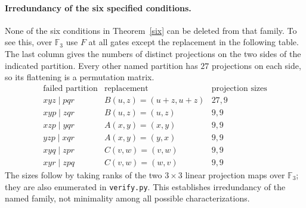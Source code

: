 \documentclass[11pt]{article}
\begin{document}
\paragraph{Irredundancy of the six specified conditions.}
None of the six conditions in Theorem~\ref{six} can be deleted from
that family. To see this, over $\mathbb F_3$ use $F$ at all gates
except the replacement in the following table. The last column gives
the numbers of distinct projections on the two sides of the indicated
partition. Every other named partition has $27$ projections on each
side, so its flattening is a permutation matrix.
\[
\begin{array}{c|c|c}
\text{failed partition}&\text{replacement}&\text{projection sizes}\\\hline
xyz\mid pqr&B(u,z)=(u+z,u+z)&27,9\\
xyp\mid zqr&B(u,z)=(u,z)&9,9\\
xzp\mid yqr&A(x,y)=(x,y)&9,9\\
yzp\mid xqr&A(x,y)=(y,x)&9,9\\
xyq\mid zpr&C(v,w)=(v,w)&9,9\\
xyr\mid zpq&C(v,w)=(w,v)&9,9
\end{array}
\]
The sizes follow by taking ranks of the two $3\times3$ linear
projection maps over $\mathbb F_3$; they are also enumerated in
\texttt{verify.py}. This establishes irredundancy of the named family,
not minimality among all possible characterizations.
\end{document}
